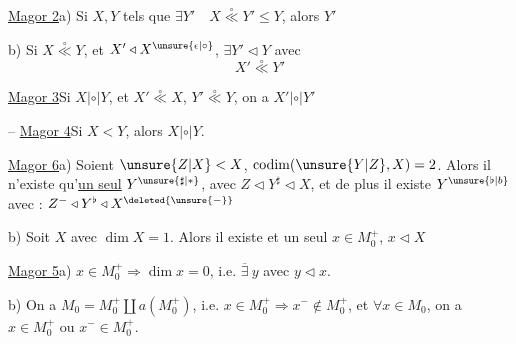 \uline{Magor 2}\quad a) Si $X,Y$ tels que $\exists Y'\quad X\overset{\circ}{\ll}Y'\leq Y$, alors $Y'$ 

b) Si $X\overset{\circ}{\ll}Y$, et $X'\triangleleft X^{\unsure{\epsilon|\circ}}$, $\exists Y'\triangleleft Y$ avec
\[
X'\overset{\circ}{\ll}Y'
\]

\uline{Magor 3}\quad Si $X|\circ|Y$, et $X'\overset{\circ}{\ll}X$, $Y'\overset{\circ}{\ll}Y$, on a $X'|\circ|Y'$

-- \uline{Magor 4}\quad Si $X<Y$, alors $X|\circ|Y$.

\uline{Magor 6}\quad a) Soient $\unsure{Z|X}<X$, $\operatorname{codim}(\unsure{Y|Z},X)=2$. Alors il n'existe qu'\uline{un seul} $Y^{\unsure{\sharp|*}}$, avec $Z\triangleleft Y^{\sharp}\triangleleft X$, et de plus il existe $Y^{\unsure{\flat|b}}$ avec : $Z^-\triangleleft Y^{\flat}\triangleleft X^{\deleted{\unsure{-}}}$

b) Soit $X$ avec $\dim X=1$. Alors il existe et un seul $x\in M_0^+$, $x\triangleleft X$ 

\uline{Magor 5}\quad a) $x\in M_0^+\Longrightarrow\dim x=0$, i.e. $\overline{\exists}\ y$ avec $y\triangleleft x$.

b) On a $M_0=M_0^+\amalg a(M_0^+)$, i.e.  $x\in M_0^+\Longrightarrow x^-\notin M_0^+$, et $\forall x\in M_0$, on a $x\in M_0^+$ ou $x^-\in M_0^+$.
